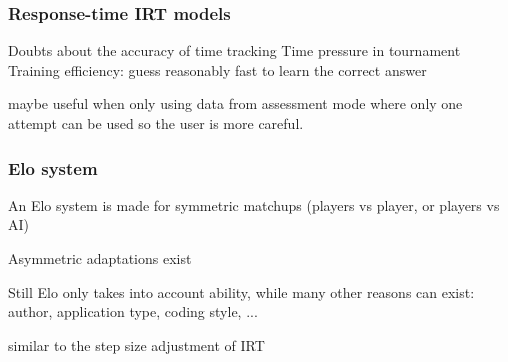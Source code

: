 \subsubsection{Response-time IRT models}
Doubts about the accuracy of time tracking
Time pressure in tournament
Training efficiency: guess reasonably fast to learn the correct answer

maybe useful when only using data from assessment mode where only one attempt can be used so the user is more careful.

\subsubsection{Elo system}
An Elo system is made for symmetric matchups (players vs player, or players vs AI)

Asymmetric adaptations exist

Still Elo only takes into account ability, while many other reasons can exist: author, application type, coding style, ...

similar to the step size adjustment of IRT